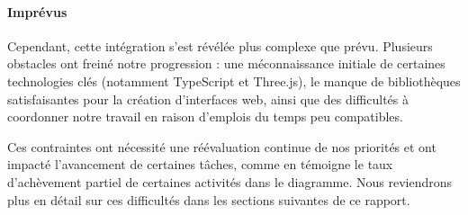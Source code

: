 \paragraph{Imprévus}
Cependant, cette intégration s’est révélée plus complexe que prévu. Plusieurs obstacles ont freiné notre progression : une méconnaissance initiale de certaines technologies clés (notamment TypeScript et Three.js), le manque de bibliothèques satisfaisantes pour la création d'interfaces web, ainsi que des difficultés à coordonner notre travail en raison d’emplois du temps peu compatibles.

Ces contraintes ont nécessité une réévaluation continue de nos priorités et ont impacté l'avancement de certaines tâches, comme en témoigne le taux d’achèvement partiel de certaines activités dans le diagramme. Nous reviendrons plus en détail sur ces difficultés dans les sections suivantes de ce rapport.


